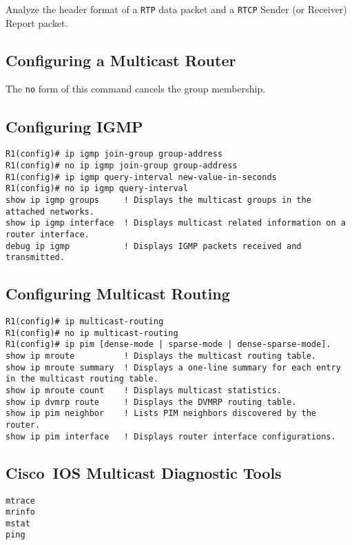 \documentclass{../UTNetLab}
\begin{document}
    Analyze the header format of a \texttt{RTP} data packet and a \texttt{RTCP} Sender (or Receiver) Report packet.


\begin{appendices}

\section{Configuring a Multicast Router}
    The \lstinline[language={cisco}]{no} form of this command cancels the group membership.
    \begin{subappendices}
\subsection{Configuring IGMP}
    \begin{lstlisting}[language={cisco}, emph={group-address, new-value-in-seconds}]
R1(config)# ip igmp join-group group-address
R1(config)# no ip igmp join-group group-address
R1(config)# ip igmp query-interval new-value-in-seconds
R1(config)# no ip igmp query-interval
show ip igmp groups     ! Displays the multicast groups in the attached networks.
show ip igmp interface  ! Displays multicast related information on a router interface.
debug ip igmp           ! Displays IGMP packets received and transmitted.
    \end{lstlisting}

\subsection{Configuring Multicast Routing}
    \begin{lstlisting}[language={cisco}]
R1(config)# ip multicast-routing
R1(config)# no ip multicast-routing
R1(config)# ip pim [dense-mode | sparse-mode | dense-sparse-mode].
show ip mroute          ! Displays the multicast routing table.
show ip mroute summary  ! Displays a one-line summary for each entry in the multicast routing table.
show ip mroute count    ! Displays multicast statistics.
show ip dvmrp route     ! Displays the DVMRP routing table.
show ip pim neighbor    ! Lists PIM neighbors discovered by the router.
show ip pim interface   ! Displays router interface configurations.
    \end{lstlisting}

\subsection{Cisco~IOS Multicast Diagnostic Tools}
\begin{lstlisting}[language={cisco}]
mtrace
mrinfo
mstat
ping
\end{lstlisting}
    
    \end{subappendices}
\end{appendices}
\end{document}
